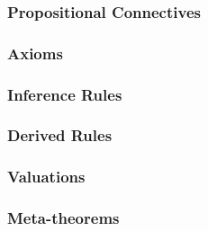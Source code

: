 \subsubsection{Propositional Connectives}


\subsubsection{Axioms}


\subsubsection{Inference Rules}


\subsubsection{Derived Rules}


\subsubsection{Valuations}


\subsubsection{Meta-theorems}

